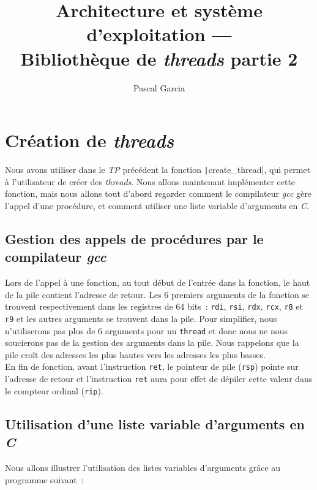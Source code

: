\documentclass[a4paper]{article}
\title{Architecture et système d'exploitation --- \\Bibliothèque de \emph{threads} partie 2}
\author{Pascal Garcia}
\begin{document}
\maketitle

\renewcommand{\labelitemi}{$\bullet$}
\renewcommand{\labelitemii}{$\star$}

\section{Création de \emph{threads}}

Nous avons utiliser dans le \emph{TP} précédent la fonction \texttt|create_thread|, qui permet à l'utilisateur
de créer des \emph{threads}. Nous allons maintenant implémenter cette fonction, mais nous allons tout d'abord
regarder comment le compilateur \emph{gcc} gère l'appel d'une procédure, et comment utiliser une liste variable
d'arguments en \emph{C}.

\subsection{Gestion des appels de procédures par le compilateur \emph{gcc}}

Lors de l'appel à une fonction, au tout début de l'entrée dans la fonction, le haut de la pile contient l'adresse de retour. Les $6$ premiers
arguments de la fonction se trouvent respectivement dans les registres de $64$ bits~: \verb+rdi+, \verb+rsi+, \verb+rdx+, \verb+rcx+, \verb+r8+ et \verb+r9+ et
les autres arguments se trouvent dans la pile. Pour simplifier, nous n'utiliserons pas plus de $6$ arguments pour un \verb+thread+ et donc nous ne nous soucierons
pas de la gestion des arguments dans la pile. Nous rappelons que la pile croît des adresses les plus hautes vers les adresses les plus basses.\\

En fin de fonction, avant l'instruction \verb+ret+, le pointeur de pile (\verb+rsp+) pointe sur l'adresse de retour et l'instruction \verb+ret+ aura pour effet de dépiler cette
valeur dans le compteur ordinal (\verb+rip+).

\subsection{Utilisation d'une liste variable d'arguments en \emph{C}}

Nous allons illustrer l'utilisation des listes variables d'arguments grâce au programme suivant~:\\
\end{document}
